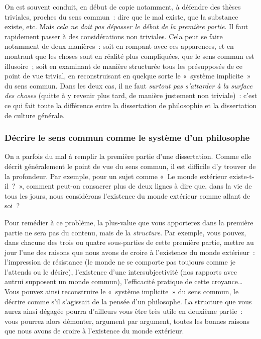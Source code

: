 \documentclass[a4paper,12pt]{article}
\begin{document}
On est souvent conduit, en début de copie notamment, à défendre des
thèses triviales, proches du sens commun : dire que le mal existe, que
la substance existe, etc. Mais \emph{cela ne doit pas dépasser le début de la
première partie}. Il faut rapidement passer à des considérations non
triviales. Cela peut se faire notamment de deux manières : soit en
rompant avec ces apparences, et en montrant que les choses sont en
réalité plus compliquées, que le sens commun est illusoire ; soit en
examinant de manière structurée tous les présupposés de ce point de vue
trivial, en reconstruisant en quelque sorte le « système implicite » du
sens commun. Dans les deux cas, il ne faut \emph{surtout pas s'attarder à la
surface des choses} (quitte à y revenir plus tard, de manière justement
non triviale) : c'est ce qui fait toute la différence entre la
dissertation de philosophie et la dissertation de culture générale.

\subsubsection{Décrire le sens commun comme le système d'un philosophe}
\label{sec-3-2-3}

On a parfois du mal à remplir la première partie d'une dissertation.
Comme elle décrit généralement le point de vue du sens commun, il est
difficile d'y trouver de la profondeur. Par exemple, pour un sujet comme
« Le monde extérieur existe-t-il ? », comment peut-on consacrer plus de
deux lignes à dire que, dans la vie de tous les jours, nous considérons
l'existence du monde extérieur comme allant de soi ?

Pour remédier à ce problème, la plus-value que vous apporterez dans la
première partie ne sera pas du contenu, mais de la \emph{structure}. Par
exemple, vous pouvez, dans chacune des trois ou quatre sous-parties de
cette première partie, mettre au jour l'une des raisons que nous avons
de croire à l'existence du monde extérieur : l'impression de résistance
(le monde ne se comporte pas toujours comme je l'attends ou le désire),
l'existence d'une intersubjectivité (nos rapports avec autrui supposent
un monde commun), l'efficacité pratique de cette croyance\ldots{} Vous pouvez
ainsi reconstruire le « système implicite » du sens commun, le décrire
comme s'il s'agissait de la pensée d'un philosophe. La structure que
vous aurez ainsi dégagée pourra d'ailleurs vous être très utile en
deuxième partie : vous pourrez alors démonter, argument par argument,
toutes les bonnes raisons que nous avons de croire à l'existence du
monde extérieur.
\end{document}

